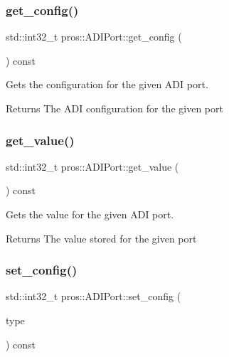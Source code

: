 \subsubsection{\texorpdfstring{get\+\_\+config()}{get\_config()}}
{\footnotesize\ttfamily std\+::int32\+\_\+t pros\+::\+A\+D\+I\+Port\+::get\+\_\+config (\begin{DoxyParamCaption}\item[{void}]{ }\end{DoxyParamCaption}) const}

Gets the configuration for the given A\+DI port.

\begin{DoxyReturn}{Returns}
The A\+DI configuration for the given port 
\end{DoxyReturn}
\mbox{\label{classpros_1_1ADIPort_ac79b5fd3ce67ae6ffc4b1fbbb306e997}} 
\subsubsection{\texorpdfstring{get\+\_\+value()}{get\_value()}}
{\footnotesize\ttfamily std\+::int32\+\_\+t pros\+::\+A\+D\+I\+Port\+::get\+\_\+value (\begin{DoxyParamCaption}\item[{void}]{ }\end{DoxyParamCaption}) const}

Gets the value for the given A\+DI port.

\begin{DoxyReturn}{Returns}
The value stored for the given port 
\end{DoxyReturn}
\mbox{\label{classpros_1_1ADIPort_abd86653eebbc34b863ace81839f7e40c}} 
\subsubsection{\texorpdfstring{set\+\_\+config()}{set\_config()}}
{\footnotesize\ttfamily std\+::int32\+\_\+t pros\+::\+A\+D\+I\+Port\+::set\+\_\+config (\begin{DoxyParamCaption}\item[{\hyperlink{adi_8h_a4efff81399e823764aa05cd5c172ea55}{adi\+\_\+port\+\_\+config\+\_\+e\+\_\+t}}]{type }\end{DoxyParamCaption}) const}

